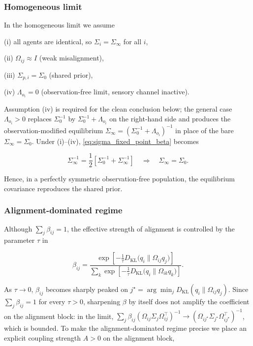 \documentclass[11pt]{article}
\begin{document}
\subsubsection{Homogeneous limit}

In the homogeneous limit we assume

(i) all agents are identical, so $\Sigma_i = \Sigma_\infty$ for all $i$,

(ii) $\Omega_{ij} \approx I$ (weak misalignment),

(iii) $\Sigma_{p,i} = \Sigma_0$ (shared prior),

(iv) $\Lambda_{o_i} = 0$ (observation-free limit, sensory channel inactive).

Assumption (iv) is required for the clean conclusion below; the general case $\Lambda_{o_i} > 0$ replaces $\Sigma_0^{-1}$ by $\Sigma_0^{-1} + \Lambda_{o_i}$ on the right-hand side and produces the observation-modified equilibrium $\Sigma_\infty = (\Sigma_0^{-1} + \Lambda_{o_i})^{-1}$ in place of the bare $\Sigma_\infty = \Sigma_0$. Under (i)--(iv), \eqref{eq:sigma_fixed_point_beta} becomes

\begin{equation}
\Sigma_\infty^{-1}
=\frac{1}{2}
\left[
\Sigma_0^{-1}
+ \Sigma_\infty^{-1}
\right]
\quad\Longrightarrow\quad
\Sigma_\infty = \Sigma_0.
\end{equation}

Hence, in a perfectly symmetric observation-free population, the equilibrium covariance reproduces the shared prior.

\subsubsection{Alignment-dominated regime}

Although $\sum_j \beta_{ij} = 1$, the effective strength of alignment is controlled by the parameter $\tau$ in

\begin{equation}
\beta_{ij}
=\frac{
\exp\left[
-\frac{1}{\tau}
D_{\mathrm{KL}}\big(q_i \| \Omega_{ij} q_j\big)
\right]
}{\sum_k
\exp\left[
-\frac{1}{\tau}
D_{\mathrm{KL}}\big(q_i \| \Omega_{ik} q_k\big)
\right]}.
\end{equation}

As $\tau \to 0$, $\beta_{ij}$ becomes sharply peaked on $j^\star = \arg\min_j D_{\mathrm{KL}}(q_i \| \Omega_{ij}q_j)$. Since $\sum_j \beta_{ij} = 1$ for every $\tau > 0$, sharpening $\beta$ by itself does not amplify the coefficient on the alignment block: in the limit, $\sum_j \beta_{ij}(\Omega_{ij}\Sigma_j\Omega_{ij}^\top)^{-1} \to (\Omega_{ij^\star}\Sigma_{j^\star}\Omega_{ij^\star}^\top)^{-1}$, which is bounded. To make the alignment-dominated regime precise we place an explicit coupling strength $A > 0$ on the alignment block,
\end{document}
